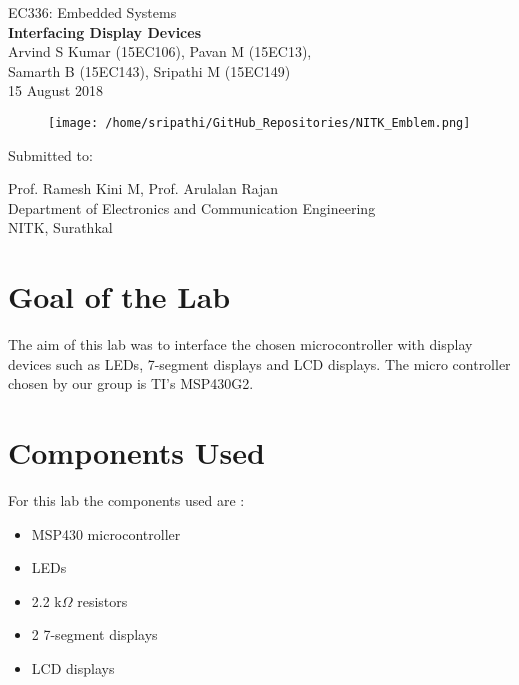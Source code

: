 \documentclass[12pt, letterpaper]{article}
\begin{document}
\begin{titlepage}

\begin{center}
	\large{EC336: Embedded Systems}\\
	\huge{\textbf{Interfacing Display Devices}}\\
	\large{Arvind S Kumar (15EC106), Pavan M (15EC13),\\ Samarth B (15EC143), Sripathi M (15EC149)}\\
	\large{15 August 2018}
\end{center}	

\begin{figure}[!h]
	\centering
	\texttt{[image: /home/sripathi/GitHub\_Repositories/NITK\_Emblem.png]}
	\label{fig:NITKEmblem}
\end{figure}	
\begin{center}
	
\huge{Submitted to:}\\
\begin{large}
Prof. Ramesh Kini M, Prof. Arulalan Rajan\\
Department of Electronics and Communication Engineering\\
NITK, Surathkal
\end{large}

\end{center}

\end{titlepage}

\section{Goal of the Lab}

The aim of this lab was to interface the chosen microcontroller with display devices such as LEDs, 7-segment displays and LCD displays. The micro controller chosen by our group is TI's MSP430G2.

\section{Components Used}

For this lab the components used are :

\begin{itemize}
	\item MSP430 microcontroller
	\item LEDs
	\item 2.2 k$\Omega$ resistors
	\item 2 7-segment displays
	\item LCD displays
\end{itemize}
\end{document}
